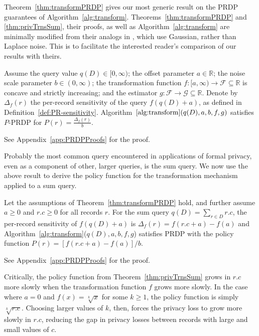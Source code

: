 \documentclass[11pt]{article}
\newcommand{\R}{\mathbb{R}}
\begin{document}
Theorem~\ref{thm:transformPRDP} gives our most generic result on the PRDP guarantees of Algorithm~\ref{alg:transform}. Theorems~\ref{thm:transformPRDP} and \ref{thm:privTrnsSum}, their proofs, as well as Algorithm~\ref{alg:transform} are minimally modified from their analogs in \cite{finleyEtAl2024}, which use Gaussian, rather than Laplace noise. This is to facilitate the interested reader's comparison of our results with theirs.

\begin{theorem}
\label{thm:transformPRDP}
    Assume the query value $q(D) \in [0,\infty)$; the offset parameter $a \in \R$; the noise scale parameter $b \in (0,\infty)$; the transformation function $f:[a,\infty) \to \mathcal{F} \subseteq \R$ is concave and strictly increasing; and the estimator $g:\mathcal{F} \to \mathcal{G} \subseteq \R$. Denote by $\Delta_f(r)$ the per-record sensitivity of the query $f(q(D) + a)$, as defined in Definition~\ref{def:PR-sensitivity}. Algorithm~$\ref{alg:transform}\allowbreak(q(D), a, b, f, g)$ satisfies $P$-PRDP for $P(r) = \frac{\Delta_f(r)}{b}$.
\end{theorem}

See Appendix~\ref{app:PRDPProofs} for the proof.

Probably the most common query encountered in applications of formal privacy, even as a component of other, larger queries, is the sum query. We now use the above result to derive the policy function for the transformation mechanism applied to a sum query.

\begin{theorem}
\label{thm:privTrnsSum}
Let the assumptions of Theorem~\ref{thm:transformPRDP} hold, and further assume $a \geq 0$ and $r.c \geq 0$ for all records $r$. For the sum query $q(D) = \sum_{r \in D} r.c$, the per-record sensitivity of $f(q(D) + a)$ is $\Delta_f(r) = f(r.c + a) - f(a)$ and Algorithm~\ref{alg:transform}($q(D),a,b,f,g$) satisfies PRDP with the policy function $P(r) = [f(r.c + a) - f(a)]/b$.
\end{theorem}

See Appendix~\ref{app:PRDPProofs} for the proof.

Critically, the policy function from Theorem~\ref{thm:privTrnsSum} grows in $r.c$ more slowly when the transformation function $f$ grows more slowly. In the case where $a = 0$ and $f(x) = \sqrt[k]{x}$ for some $k \geq 1$, the policy function is simply $\sqrt[k]{r.c}$. Choosing larger values of $k$, then, forces the privacy loss to grow more slowly in $r.c$, reducing the gap in privacy losses between records with large and small values of $c$.
\end{document}
